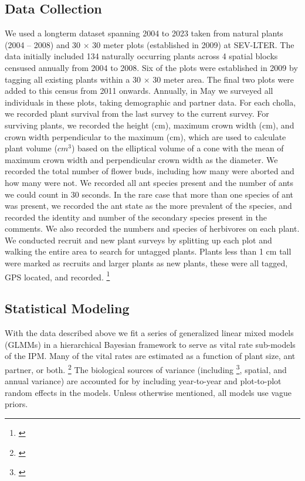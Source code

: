 \documentclass[11pt]{article}
\newcommand{\tom}[2]{{\color{red}{#1}}\footnote{\textit{\color{red}{#2}}}}
\begin{document}
\subsection*{Data Collection}
We used a longterm dataset spanning 2004 to 2023 taken from natural plants (2004 -- 2008) and 30 $\times$ 30 meter plots (established in 2009) at SEV-LTER. 
The data initially included 134 naturally occurring plants across 4 spatial blocks censused annually from 2004 to 2008.
Six of the plots were established in 2009 by tagging all existing plants within a 30 $\times$ 30 meter area. 
The final two plots were added to this census from 2011 onwards. 
Annually, in May we surveyed all individuals in these plots, taking demographic and partner data. 
For each cholla, we recorded plant survival from the last survey to the current survey. 
For surviving plants, we recorded the height (cm), maximum crown width (cm), and crown width perpendicular to the maximum (cm), which are used to calculate plant volume ($cm^3$) based on the  elliptical volume of a cone with the mean of maximum crown width and perpendicular crown width as the diameter. 
We recorded the total number of flower buds, including how many were aborted and how many were not. 
We recorded all ant species present and the number of ants we could count in 30 seconds.
In the rare case that more than one species of ant was present, we recorded the ant state as the more prevalent of the species, and recorded the identity and number of the secondary species present in the comments. 
We also recorded the numbers and species of herbivores on each plant.
We conducted recruit and new plant surveys by splitting up each plot and walking the entire area to search for untagged plants. 
Plants less than 1 cm tall were marked as recruits and larger plants as new plants, these were all tagged, GPS located, and recorded. 
\tom{}{Also need to describe recruit data, seed banks, seed counts per fruit.}
		
\subsection*{Statistical Modeling}
	
With the data described above we fit a series of generalized linear mixed models (GLMMs) in a hierarchical Bayesian framework to serve as vital rate sub-models of the IPM.
Many of the vital rates are estimated as a function of plant size, ant partner, or both.
\tom{Ant partner type is included as a predictor only where there are biological pathways through which ants could impact the outcome of that process. }{This needs to be explained.}
The biological sources of variance (including \tom{individual}{But you do not have an individual random effect.}, spatial, and annual variance) are accounted for by including year-to-year and plot-to-plot random effects in the models. 
Unless otherwise mentioned, all models use vague priors. 
\end{document}
